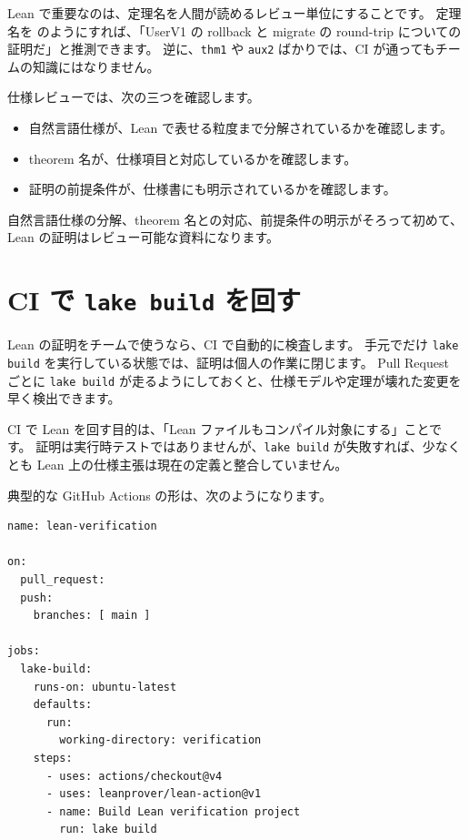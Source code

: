 Lean で重要なのは、定理名を人間が読めるレビュー単位にすることです。
定理名を  のようにすれば、「UserV1 の rollback と migrate の round-trip についての証明だ」と推測できます。
逆に、\texttt{thm1} や \texttt{aux2} ばかりでは、CI が通ってもチームの知識にはなりません。

仕様レビューでは、次の三つを確認します。

\begin{itemize}
\item 自然言語仕様が、Lean で表せる粒度まで分解されているかを確認します。
\item theorem 名が、仕様項目と対応しているかを確認します。
\item 証明の前提条件が、仕様書にも明示されているかを確認します。
\end{itemize}

自然言語仕様の分解、theorem 名との対応、前提条件の明示がそろって初めて、Lean の証明はレビュー可能な資料になります。

\section{CI で \texttt{lake build} を回す}

Lean の証明をチームで使うなら、CI で自動的に検査します。
手元でだけ \texttt{lake build} を実行している状態では、証明は個人の作業に閉じます。
Pull Request ごとに \texttt{lake build} が走るようにしておくと、仕様モデルや定理が壊れた変更を早く検出できます。

CI で Lean を回す目的は、「Lean ファイルもコンパイル対象にする」ことです。
証明は実行時テストではありませんが、\texttt{lake build} が失敗すれば、少なくとも Lean 上の仕様主張は現在の定義と整合していません。

典型的な GitHub Actions の形は、次のようになります。

\begin{listing}[htbp]
\begin{verbatim}
name: lean-verification

on:
  pull_request:
  push:
    branches: [ main ]

jobs:
  lake-build:
    runs-on: ubuntu-latest
    defaults:
      run:
        working-directory: verification
    steps:
      - uses: actions/checkout@v4
      - uses: leanprover/lean-action@v1
      - name: Build Lean verification project
        run: lake build
\end{verbatim}
\caption{\texttt{lean-verification}}
\label{lst:ch36-ci-build}
\end{listing}

